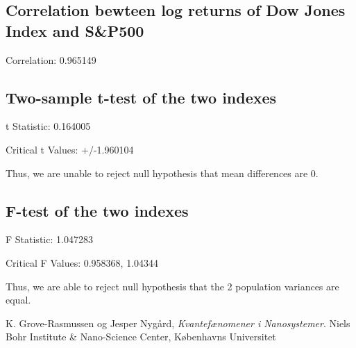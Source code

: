 \documentclass[a4paper]{article}
\begin{document}
\subsection{Correlation bewteen log returns of Dow Jones Index and S\&P500}
\begin{flushleft}
Correlation: 0.965149
\end{flushleft}

\subsection{Two-sample t-test of the two indexes}
\begin{flushleft}
t Statistic: 0.164005

Critical t Values: +/-1.960104

Thus, we are unable to reject null hypothesis that mean differences are 0.
\end{flushleft}

\subsection{F-test of the two indexes}
\begin{flushleft}
F Statistic: 1.047283

Critical F Values: 0.958368, 1.04344

Thus, we are able to reject null hypothesis that the 2 population variances are equal.
\end{flushleft}

\newpage
\begin{thebibliography}{9}
  K. Grove-Rasmussen og Jesper Nygård,
  \emph{Kvantefænomener i Nanosystemer}.
  Niels Bohr Institute \& Nano-Science Center, Københavns Universitet

\end{thebibliography}
\end{document}
